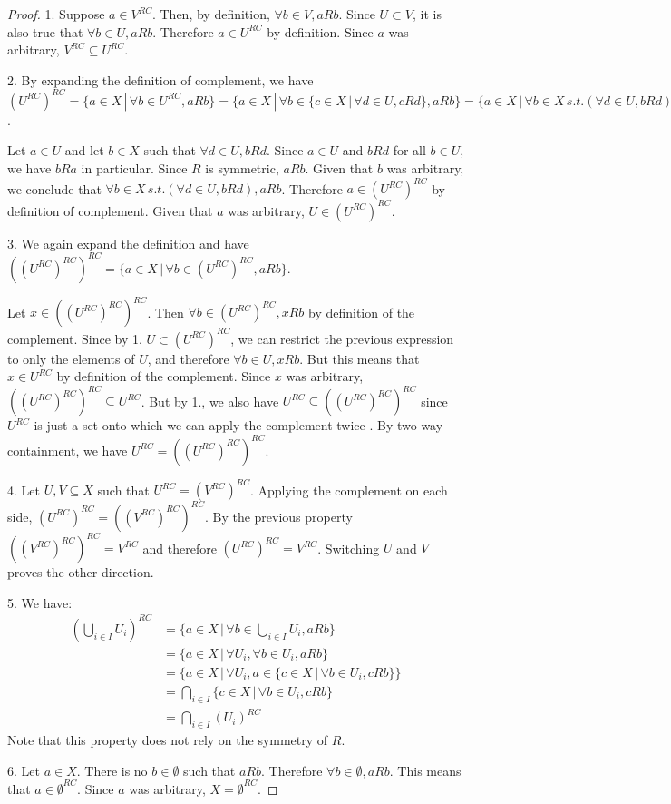 \begin{proof}
	1. Suppose $a \in V^{RC}$. Then, by definition, $\forall b \in V, aRb$. Since $U \subset V$, it is also true that $\forall b \in U, aRb$. Therefore $a \in U^{RC}$ by definition. Since $a$ was arbitrary, $V^{RC} \subseteq U^{RC}$.
	
	2. By expanding the definition of complement, we have $(U^{RC})^{RC}=\{ a \in X \, | \, \forall b \in U^{RC}, aRb \} = \{ a \in X \, | \, \forall b \in \{ c \in X \, | \, \forall d \in U, cRd  \}, aRb \} = \{ a \in X \, | \, \forall b \in X \, s.t. (\forall d \in U, bRd), aRb \}$.
	
	Let $a \in U$ and let $b \in X$ such that $\forall d \in U, bRd$. Since $a \in U$ and $bRd$ for all $b \in U$, we have $bRa$ in particular. Since $R$ is symmetric, $aRb$. Given that $b$ was arbitrary, we conclude that $\forall b \in X \, s.t. (\forall d \in U, bRd), aRb$. Therefore $a \in (U^{RC})^{RC}$ by definition of complement. Given that $a$ was arbitrary, $U \in (U^{RC})^{RC}$.
	
	3. We again expand the definition and have $((U^{RC})^{RC})^{RC} = \{ a \in X \, | \, \forall b \in (U^{RC})^{RC}, aRb \}$.
	
	Let $x \in ((U^{RC})^{RC})^{RC}$. Then $\forall b \in (U^{RC})^{RC}, xRb$ by definition of the complement. Since by 1. $U \subset (U^{RC})^{RC}$, we can restrict the previous expression to only the elements of $U$, and therefore $\forall b \in U, xRb$. But this means that $x \in U^{RC}$ by definition of the complement. Since $x$ was arbitrary, $((U^{RC})^{RC})^{RC} \subseteq U^{RC}$. But by 1., we also have $U^{RC} \subseteq ((U^{RC})^{RC})^{RC}$ since $U^{RC}$ is just a set onto which we can apply the complement twice . By two-way containment, we have $U^{RC} = ((U^{RC})^{RC})^{RC}$.
	
	4. Let $U, V \subseteq X$ such that $U^{RC} = (V^{RC})^{RC}$. Applying the complement on each side, $(U^{RC})^{RC} = ((V^{RC})^{RC})^{RC}$. By the previous property $((V^{RC})^{RC})^{RC} = V^{RC}$ and therefore $(U^{RC})^{RC} = V^{RC}$. Switching $U$ and $V$ proves the other direction.
	
	5. We have:
	\begin{equation*}
		\begin{aligned}
		(\bigcup_{i \in I} U_i )^{RC} &= \{ a \in X \, | \, \forall b \in \bigcup_{i \in I} U_i, aRb \} \\
		&= \{ a \in X \, | \, \forall U_i, \forall  b \in U_i, aRb \} \\
		&= \{ a \in X \, | \, \forall U_i, a \in \{ c \in X \, | \,  \forall  b \in U_i, cRb \} \} \\
		&= \bigcap_{i \in I} \{ c \in X \, | \, \forall  b \in U_i, cRb\} \\
		&= \bigcap_{i \in I} (U_i)^{RC}
	\end{aligned}
	\end{equation*}
	Note that this property does not rely on the symmetry of $R$.
	
	6. Let $a \in X$. There is no $b \in \emptyset$ such that $aRb$. Therefore $\forall b \in \emptyset, aRb$. This means that $a \in \emptyset^{RC}$. Since $a$ was arbitrary, $X = \emptyset^{RC}$.
\end{proof}

